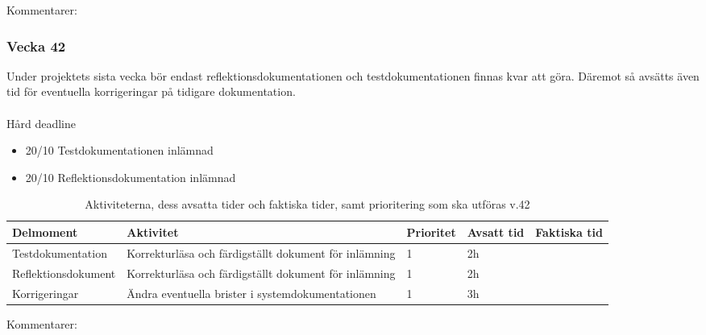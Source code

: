 \documentclass{TDP003mall}
\begin{document}
Kommentarer:
\\

\pagebreak

\subsubsection*{Vecka 42}

Under projektets sista vecka bör endast reflektionsdokumentationen och testdokumentationen finnas kvar att göra. Däremot så avsätts även tid för eventuella korrigeringar på tidigare dokumentation.
\\
\\
Hård deadline

\begin{itemize}
\color{red}
    \item 20/10 Testdokumentationen inlämnad
    \item 20/10 Reflektionsdokumentation inlämnad
\end{itemize}
\begin{table}[h]
\begin{tabularx}{\textwidth}{|l|X|l|l|l|}
  \hline
    Delmoment & Aktivitet & Prioritet & Avsatt tid & Faktiska tid\\ \hline
        Testdokumentation   & Korrekturläsa och färdigställt dokument för inlämning & 1  & 2h   &   \\  \hline
        Reflektionsdokument & Korrekturläsa och färdigställt dokument för inlämning  & 1  & 2h  & \\  \hline
        Korrigeringar & Ändra eventuella brister i systemdokumentationen & 1 & 3h  &
\\   \hline
\end{tabularx}
\centering
    \caption{\label{tab:table-name}Aktiviteterna, dess avsatta tider och faktiska tider, samt prioritering som ska utföras v.42}
\end{table}

Kommentarer:
\pagebreak
\end{document}
